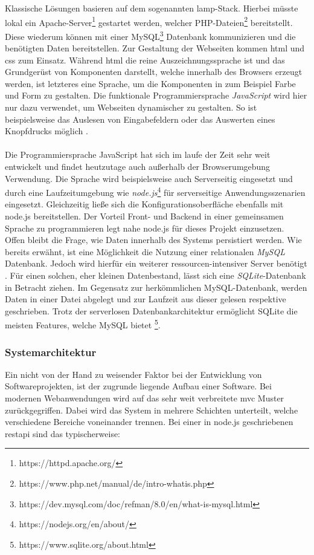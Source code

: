 Klassische Lösungen basieren auf dem sogenannten \gls{lamp}-Stack. Hierbei müsste lokal ein Apache-Server\footnote{https://httpd.apache.org/} gestartet werden, welcher PHP-Dateien\footnote{https://www.php.net/manual/de/intro-whatis.php} bereitstellt. Diese wiederum können mit einer MySQL\footnote{https://dev.mysql.com/doc/refman/8.0/en/what-is-mysql.html} Datenbank kommunizieren und die benötigten Daten bereitstellen. Zur Gestaltung der Webseiten kommen \gls{html} und \gls{css} zum Einsatz. Während \gls{html} die reine Auszeichnungssprache ist und das Grundgerüst von Komponenten darstellt, welche innerhalb des Browsers erzeugt werden, ist letzteres eine Sprache, um die Komponenten in zum Beispiel Farbe und Form zu gestalten. Die funktionale Programmiersprache \textit{JavaScript} wird hier nur dazu verwendet, um Webseiten dynamischer zu gestalten. So ist beispielsweise das Auslesen von Eingabefeldern oder das Auswerten eines Knopfdrucks möglich \cite{Gerner.2006}. \\ \\ Die Programmiersprache JavaScript hat sich im laufe der Zeit sehr weit entwickelt und findet heutzutage auch außerhalb der Browserumgebung Verwendung. Die Sprache wird beispielsweise auch Serverseitig eingesetzt und durch eine Laufzeitumgebung wie \textit{node.js}\footnote{https://nodejs.org/en/about/} für serverseitige Anwendungsszenarien eingesetzt. \cite{Resig.2016} Gleichzeitig ließe sich die Konfigurationsoberfläche ebenfalls mit node.js bereitstellen. Der Vorteil Front- und Backend in einer gemeinsamen Sprache zu programmieren legt nahe node.js für dieses Projekt einzusetzen. \\ Offen bleibt die Frage, wie Daten innerhalb des Systems persistiert werden. Wie bereits erwähnt, ist eine Möglichkeit die Nutzung einer relationalen \textit{MySQL} Datenbank. Jedoch wird hierfür ein weiterer ressourcen-intensiver Server benötigt \cite{Gerner.2006}. Für einen solchen, eher kleinen Datenbestand, lässt sich eine \textit{SQLite}-Datenbank in Betracht ziehen. Im Gegensatz zur herkömmlichen MySQL-Datenbank, werden Daten in einer Datei abgelegt und zur Laufzeit aus dieser gelesen respektive geschrieben. Trotz der serverlosen Datenbankarchitektur ermöglicht SQLite die meisten Features, welche MySQL bietet \footnote{https://www.sqlite.org/about.html}. 

\subsubsection{Systemarchitektur} \label{subsub:system-architectuere}
Ein nicht von der Hand zu weisender Faktor bei der Entwicklung von Softwareprojekten, ist der zugrunde liegende Aufbau einer Software. Bei modernen Webanwendungen wird auf das sehr weit verbreitete \gls{mvc} Muster zurückgegriffen. Dabei wird das System in mehrere Schichten unterteilt, welche verschiedene Bereiche voneinander trennen. Bei einer in node.js geschriebenen \gls{restapi} sind das typischerweise:

